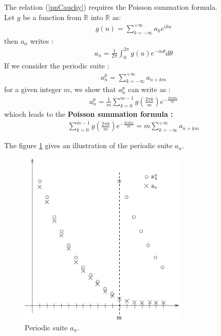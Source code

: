 The relation (\ref{pnCauchy}) requires the Poisson summation formula.\\

Let  $g$ be a function from $\mathbb{R}$ into $\mathbb{R}$ as:
\begin{eqnarray}\label{g2u}
g(u) = \sum_{k=-\infty}^{+\infty} a_k e^{iku}
\end{eqnarray}
then $a_n$ writes :
\begin{eqnarray}\label{an}
a_n = \frac{1}{2\pi}\int_{0}^{2\pi} g(u)e^{-in\theta} d\theta
\end{eqnarray}
If we consider the periodic suite :
\begin{eqnarray}\label{anp}
a_n^p =  \sum_{k=-\infty}^{+\infty} a_{n+km}
\end{eqnarray}
for a given integer $m$, we show that $a_n^p$ can write as : 
\begin{eqnarray}\label{anp2}
a_n^p =  \displaystyle \frac{1}{m} \sum_{k=0}^{m-1} g\left(\frac{2\pi k}{m}\right)e^{-\frac{2i\pi kn}{m}}
\end{eqnarray}
whioch leads to the  {\bf Poisson summation formula :}
\begin{eqnarray}\label{forSomPoisson}
\sum_{k=0}^{m-1} g\left(\frac{2\pi k}{m}\right)e^{-\frac{2i\pi kn}{m}} = m \sum_{k=-\infty}^{+\infty}a_{n+km}
\end{eqnarray}

The figure \ref{FigAnp} gives an illustration of the periodic suite $a_n$.

\begin{figure}[Hhbtp]
     \begin{center}
      \includegraphics[width=8cm]{figAnp.pdf} 
      \caption{Periodic suite $a_n$.}
      \label{FigAnp}
    \end{center}
 \end{figure}





